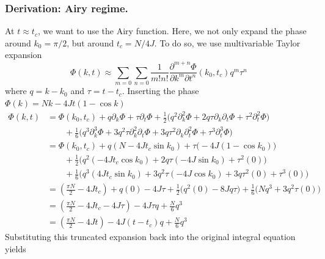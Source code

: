 \documentclass[../../../main.tex]{subfiles}
\begin{document}
\subsubsection{Derivation: Airy regime.}
At $t \approx t_c$, we want to use the Airy function.
Here, we not only expand the phase around $k_0 = \pi/2$, but around $t_c = N/4J$.
To do so, we use multivariable Taylor expansion
\begin{equation*}
  \Phi(k, t) \approx \sum_{m=0} \sum_{n=0} \frac{1}{m!n!} \frac{\partial^{m+n}\Phi}{\partial k^m \partial t^n}\left(k_0, t_c\right) q^m \tau^n
\end{equation*}
where $q=k-k_0 $ and $\tau = t-t_c$.
Inserting the phase $        \Phi(k)  =  Nk - 4Jt (1  - \cos k) $
\begin{align*}
  \Phi (k,t) & = \Phi(k_0,t_c) + q\partial_k\Phi  +\tau \partial_t \Phi  + \frac{1}{2} \big( q^2 \partial_k^2\Phi  + 2 q\tau \partial _k  \partial_t  \Phi  + \tau^2 \partial_t^2  \Phi\big) \\
             & \qquad + \frac{1}{6}\big(q^3\partial_k ^{3}\Phi  + 3q^2\tau \partial_k ^{2}\partial_t\Phi + 3 q\tau^2 \partial_k\partial_t^2\Phi + \tau^3 \partial_t^3\Phi \big)              \\
             & = \Phi(k_0,t_c) + q(N - 4Jt_c \sin k_0 ) + \tau \big( -4J(1-\cos k_0) \big)                                                                                                   \\
             & \qquad + \frac{1}{2} \big( q^2 (-4Jt_c \cos k_0) + 2q\tau (-4J \sin k_0) + \tau^2 (0) \big)                                                                                   \\
             & \qquad + \frac{1}{6} \big( q^3 (4Jt_c \sin k_0) + 3q^2\tau (-4J \cos k_0) + 3q\tau^2 (0) + \tau^3 (0) \big)                                                                   \\
             & = \left( \frac{\pi N}{2} - 4Jt_c \right) + q(0) - 4J\tau + \frac{1}{2} \big( q^2(0) - 8Jq\tau \big) + \frac{1}{6} \big( Nq^3 + 3q^2\tau(0) \big)                              \\
             & = \left( \frac{\pi N}{2} - 4Jt_c - 4J\tau \right) - 4J\tau q + \frac{N}{6}q^3                                                                                                 \\
             & = \left( \frac{\pi N}{2} - 4Jt \right) - 4J(t-t_c)q + \frac{N}{6}q^3
\end{align*}
Substituting this truncated  expansion back into the original integral equation yields
\end{document}
